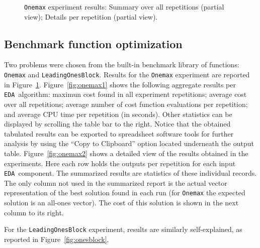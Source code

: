 \documentclass{sig-alternate}
\newcommand{\EDA}{\texttt{EDA}}
\newcommand{\figref}[1]{\mbox{Figure \ref{#1}}}
\begin{document}
\begin{figure}[H]
{	\label{fig:onemax2}}
	\caption{\texttt{Onemax} experiment results:  Summary over all repetitions (partial view);  Details per repetition (partial view).}
	\label{fig:onemax}
\end{figure}

\subsection{Benchmark function optimization}
Two problems were chosen from the built-in benchmark library of functions: \texttt{Onemax} and \texttt{LeadingOnesBlock}. Results for the \texttt{Onemax} experiment are reported in \figref{fig:onemax}. \figref{fig:onemax1} shows the following aggregate results per \EDA~algorithm: maximun cost found in all experiment repetitions; average cost over all repetitions; average number of cost function evaluations per repetition; and average CPU time per repetition (in seconds). Other statistics can be displayed by scrolling the table bar to the right. Notice that the obtained tabulated results can be exported to spreadsheet software tools for further analysis by using the ``Copy to Clipboard'' option located underneath the output table. \figref{fig:onemax2} shows a detailed view of the results obtained in the experiments. Here each row holds the outputs per repetition for each input \EDA~component. The summarized results are statistics of these individual records. The only column not used in the summarized report is the actual vector representation of the best solution found in each run (for \texttt{Onemax} the expected solution is an all-ones vector). The cost of this solution is shown in the next column to its right.  

For the \texttt{LeadingOnesBlock} experiment, results are similarly self-explained, as reported in \figref{fig:onesblock}.
\end{document}
